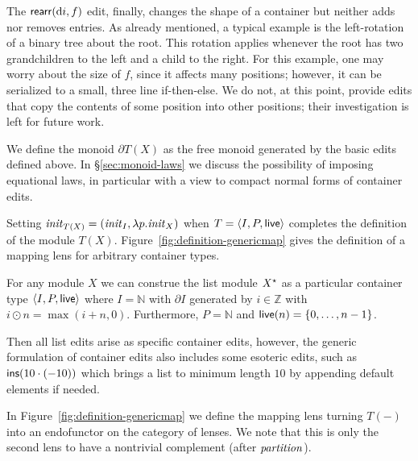 The $\mathsf{rearr}(\textrm{d} i,f)$ edit, finally, changes the shape of a
container but neither adds nor removes entries. As already mentioned,
a typical example is the left-rotation of a binary tree about the
root. This rotation applies whenever the root has two grandchildren to
the left and a child to the right. For this example, one may worry
about the size of $f$, since it affects many positions; however, it
can be serialized to a small, three line if-then-else. We
do not, at this point, provide edits that copy the contents of some
position into other positions; their investigation is left for
future work.

We define the monoid $\partial T(X)$ as the free monoid generated by
the basic edits defined above. In \S\ref{sec:monoid-laws} we discuss
the possibility of imposing equational laws, in particular with a view
to compact normal forms of container edits.

Setting $\mathit{init}_{T(X)}=(\mathit{init}_I, \lambda p.\mathit{init}_X)$ when
$T=\left<I,P,\mathsf{live}\right>$
completes the definition of the module $T(X)$.
\iffull
Figure~\ref{fig:definition-genericmap} gives the definition of a mapping
lens for arbitrary container types.
\else

\begin{example}
  For any module $X$ we can construe the list module $X^\star$ as a
  particular container type $\langle I,P,\mathsf{live}\rangle$ where
  $I=\mathbb{N}$ with $\partial I$ generated by $i\in\mathbb{Z}$ with
  $i\odot n=\max(i+n,0)$. Furthermore, $P=\mathbb{N}$ and $\mathsf{live}(n)=\{0,\dots,n-1\}$. 

  Then all list edits arise as specific container edits, however, the
  generic formulation of container edits also includes some esoteric
  edits, such as $\mathsf{ins}(10\cdot (-10))$ which brings a list to
  minimum length $10$ by appending default elements if needed.
\end{example}

In Figure~\ref{fig:definition-genericmap} we define the
mapping lens turning $T(-)$ into an endofunctor on the category of
lenses. We note that this is only the second lens to have a nontrivial
complement (after $\mathit{partition}$).

